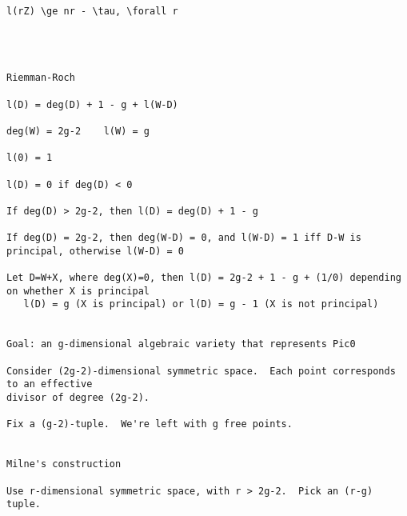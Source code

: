 {\begin{verbatim}
l(rZ) \ge nr - \tau, \forall r




Riemman-Roch

l(D) = deg(D) + 1 - g + l(W-D)

deg(W) = 2g-2    l(W) = g

l(0) = 1

l(D) = 0 if deg(D) < 0

If deg(D) > 2g-2, then l(D) = deg(D) + 1 - g

If deg(D) = 2g-2, then deg(W-D) = 0, and l(W-D) = 1 iff D-W is principal, otherwise l(W-D) = 0

Let D=W+X, where deg(X)=0, then l(D) = 2g-2 + 1 - g + (1/0) depending on whether X is principal
   l(D) = g (X is principal) or l(D) = g - 1 (X is not principal)


Goal: an g-dimensional algebraic variety that represents Pic0

Consider (2g-2)-dimensional symmetric space.  Each point corresponds to an effective
divisor of degree (2g-2).

Fix a (g-2)-tuple.  We're left with g free points.


Milne's construction

Use r-dimensional symmetric space, with r > 2g-2.  Pick an (r-g) tuple.

\end{verbatim}
}

\vfill\eject
{}

